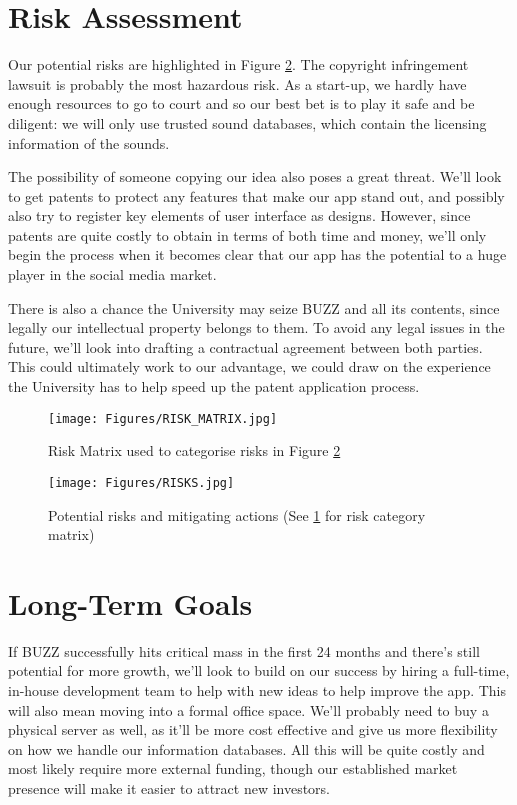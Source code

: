 \documentclass[12pt]{article}
\begin{document}
\section{Risk Assessment}

Our potential risks are highlighted in Figure \ref{fig:risks}. The copyright infringement lawsuit is probably the most hazardous risk. As a start-up, we hardly have enough resources to go to court and so our best bet is to play it safe and be diligent: we will only use trusted sound databases, which contain the licensing information of the sounds.  
 
The possibility of someone copying our idea also poses a great threat. We’ll look to get patents to protect any features that make our app stand out, and possibly also try to register key elements of user interface as designs. However, since patents are quite costly to obtain in terms of both time and money, we’ll only begin the process when it becomes clear that our app has the potential to a huge player in the social media market.

There is also a chance the University may seize BUZZ and all its contents, since legally our intellectual property belongs to them. To avoid any legal issues in the future, we'll look into drafting a contractual agreement between both parties. This could ultimately work to our advantage, we could draw on the experience the University has to help speed up the patent application process.

\begin{figure}[!hb]
    \centering
    \texttt{[image: Figures/RISK\_MATRIX.jpg]}
    \caption{
    Risk Matrix used to categorise risks in Figure \ref{fig:risks}}
    \label{fig:riskMatrix}
\end{figure}

\begin{figure}[!hp]
    \centering
    \texttt{[image: Figures/RISKS.jpg]}
    \caption{Potential risks and mitigating actions (See \ref{fig:riskMatrix} for risk category matrix)}
    \label{fig:risks}
\end{figure}

\section{Long-Term Goals}
If BUZZ successfully hits critical mass in the first 24 months and there’s still potential for more growth, we’ll look to build on our success by hiring a full-time, in-house development team to help with new ideas to help improve the app. This will also mean moving into a formal office space. We’ll probably need to buy a physical server as well, as it’ll be more cost effective and give us more flexibility on how we handle our information databases. All this will be quite costly and most likely require more external funding, though our established market presence will make it easier to attract new investors.
\end{document}
